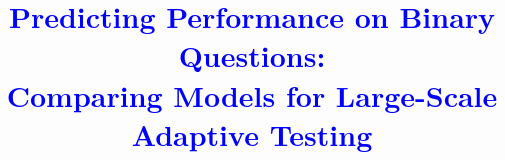 \documentclass{sig-alternate}
\newcommand\note[1]{\textcolor{blue}{#1}}
\begin{document}
%

\title{\note{Predicting Performance on Binary Questions:\\Comparing Models for Large-Scale Adaptive Testing}}
%
%
%
%
%
\end{document}
